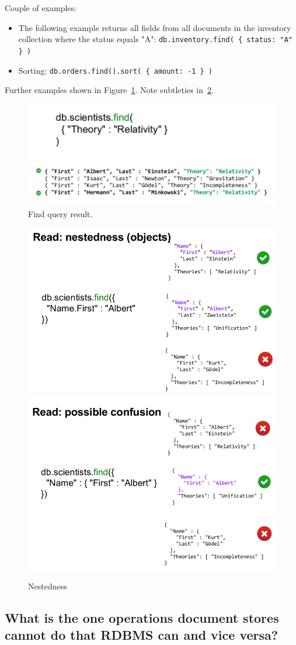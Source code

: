 \documentclass{article}
\begin{document}
Couple of examples:
\begin{itemize}
\item The following example returns all fields from all documents in the inventory collection where the status equals "A": \verb|db.inventory.find( { status: "A" } )|
\item Sorting: \verb|db.orders.find().sort( { amount: -1 } )|
\end{itemize}

Further examples shown in Figure~\ref{fig:queryresult}. Note subtleties in~\ref{fig:nestedness}.

\begin{figure}
  \centering
  \includegraphics[width=.5\textwidth]{img/read_statement_mongodb.png}
  \caption{Find query result.}
  \label{fig:queryresult}
\end{figure}

\begin{figure}
  \centering
  \includegraphics[width=.45\textwidth]{img/nestedness_1.png}
  \hfill
  \includegraphics[width=.45\textwidth]{img/nestedness_2.png}
  \caption{Nestedness}
  \label{fig:nestedness}
\end{figure}
\subsection{What is the one operations document stores cannot do that RDBMS can and vice versa? }
\end{document}
